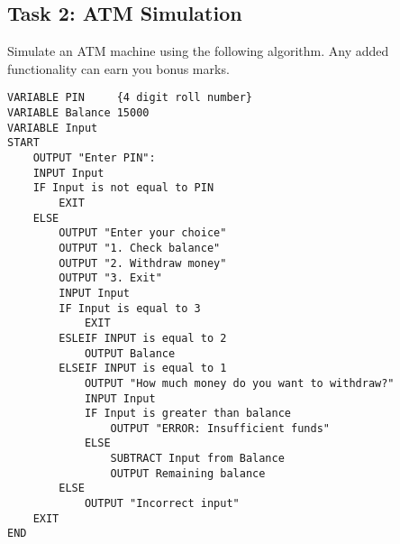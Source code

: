 \documentclass[12pt,a4paper]{article}
\begin{document}
\subsection{Task 2: ATM Simulation}
Simulate an ATM machine using the following algorithm. Any added functionality can earn you bonus marks.
\begin{lstlisting}
VARIABLE PIN     {4 digit roll number}
VARIABLE Balance 15000
VARIABLE Input
START
	OUTPUT "Enter PIN":
	INPUT Input
	IF Input is not equal to PIN
		EXIT
	ELSE
		OUTPUT "Enter your choice"
		OUTPUT "1. Check balance"
		OUTPUT "2. Withdraw money"
		OUTPUT "3. Exit"
		INPUT Input
		IF Input is equal to 3
			EXIT
		ESLEIF INPUT is equal to 2
			OUTPUT Balance
		ELSEIF INPUT is equal to 1
			OUTPUT "How much money do you want to withdraw?"
			INPUT Input
			IF Input is greater than balance
				OUTPUT "ERROR: Insufficient funds"
			ELSE
				SUBTRACT Input from Balance
				OUTPUT Remaining balance
		ELSE
			OUTPUT "Incorrect input"
	EXIT
END
\end{lstlisting}
\end{document}
